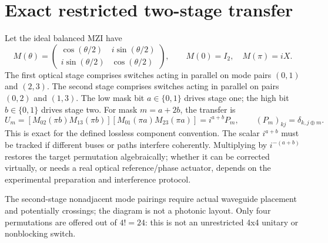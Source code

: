 \documentclass[10pt]{article}
\begin{document}
\section{Exact restricted two-stage transfer}
Let the ideal balanced MZI have
\[
M(\theta)=
\begin{pmatrix}
\cos(\theta/2)&i\sin(\theta/2)\\
i\sin(\theta/2)&\cos(\theta/2)
\end{pmatrix},\qquad
M(0)=I_2,\quad M(\pi)=iX.
\]
The first optical stage comprises switches acting in parallel on
mode pairs $(0,1)$ and $(2,3)$. The second stage comprises
switches acting in parallel on pairs $(0,2)$ and $(1,3)$.
The low mask bit $a\in\{0,1\}$ drives stage one;
the high bit $b\in\{0,1\}$ drives stage two.
For mask $m=a+2b$, the transfer is
\[
U_m=
 \left[M_{02}(\pi b)M_{13}(\pi b)\right]
 \left[M_{01}(\pi a)M_{23}(\pi a)\right]
 =i^{a+b}P_m,\qquad
 (P_m)_{kj}=\delta_{k,j\oplus m}.
\]
This is exact for the defined lossless component convention.
The scalar $i^{a+b}$ must be tracked if different buses or paths
interfere coherently. Multiplying by $i^{-(a+b)}$ restores the target
permutation algebraically; whether it can be corrected virtually,
or needs a real optical reference/phase actuator, depends on
the experimental preparation and interference protocol.
\begin{center}
\end{center}
The second-stage nonadjacent mode pairings require actual waveguide
placement and potentially crossings; the diagram is not a photonic
layout. Only four permutations are offered out of $4!=24$:
this is not an unrestricted 4x4 unitary or nonblocking switch.
\end{document}
